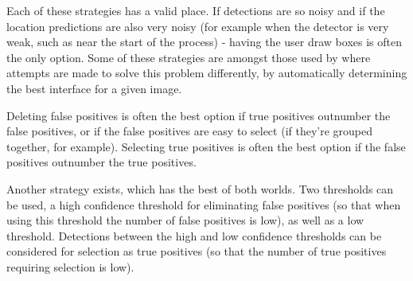 Each of these strategies has a valid place. If detections are so noisy and if the location predictions are also very noisy (for example when the detector is very weak, such as near the start of the process) - having the user draw boxes is often the only option. Some of these strategies are amongst those used by \cite{Konyushkova2017} where attempts are made to solve this problem differently, by automatically determining the best interface for a given image.

Deleting false positives is often the best option if true positives outnumber the false positives, or if the false positives are easy to select (if they're grouped together, for example). Selecting true positives is often the best option if the false positives outnumber the true positives. 

Another strategy exists, which has the best of both worlds. Two thresholds can be used, a high confidence threshold for eliminating false positives (so that when using this threshold the number of false positives is low), as well as a low threshold. Detections between the high and low confidence thresholds can be considered for selection as true positives (so that the number of true positives requiring selection is low).


